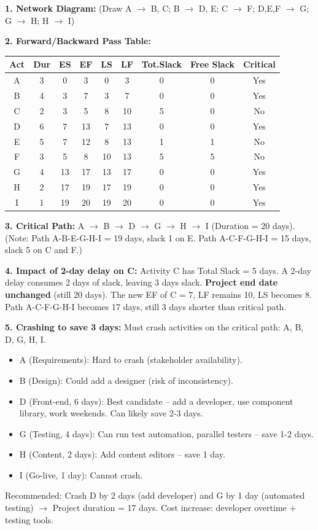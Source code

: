 \documentclass[11pt]{article}
\begin{document}
\begin{corrige}
\textbf{1. Network Diagram:} (Draw A $\to$ B, C; B $\to$ D, E; C $\to$ F; D,E,F $\to$ G; G $\to$ H; H $\to$ I)

\textbf{2. Forward/Backward Pass Table:}

\begin{center}
\begin{tabular}{|c|c|c|c|c|c|c|c|c|}\hline
\rowcolor{popblueL}
Act & Dur & ES & EF & LS & LF & Tot.Slack & Free Slack & Critical \\ \hline
A & 3 & 0 & 3 & 0 & 3 & 0 & 0 & Yes \\
B & 4 & 3 & 7 & 3 & 7 & 0 & 0 & Yes \\
C & 2 & 3 & 5 & 8 & 10 & 5 & 0 & No \\
D & 6 & 7 & 13 & 7 & 13 & 0 & 0 & Yes \\
E & 5 & 7 & 12 & 8 & 13 & 1 & 1 & No \\
F & 3 & 5 & 8 & 10 & 13 & 5 & 5 & No \\
G & 4 & 13 & 17 & 13 & 17 & 0 & 0 & Yes \\
H & 2 & 17 & 19 & 17 & 19 & 0 & 0 & Yes \\
I & 1 & 19 & 20 & 19 & 20 & 0 & 0 & Yes \\ \hline
\end{tabular}
\end{center}

\textbf{3. Critical Path:} A $\to$ B $\to$ D $\to$ G $\to$ H $\to$ I (Duration = 20 days).
(Note: Path A-B-E-G-H-I = 19 days, slack 1 on E. Path A-C-F-G-H-I = 15 days, slack 5 on C and F.)

\textbf{4. Impact of 2-day delay on C:} Activity C has Total Slack = 5 days. A 2-day delay consumes 2 days of slack, leaving 3 days slack. \textbf{Project end date unchanged} (still 20 days). The new EF of C = 7, LF remains 10, LS becomes 8. Path A-C-F-G-H-I becomes 17 days, still 3 days shorter than critical path.

\textbf{5. Crashing to save 3 days:} Must crash activities on the critical path: A, B, D, G, H, I.
\begin{itemize}
    \item A (Requirements): Hard to crash (stakeholder availability).
    \item B (Design): Could add a designer (risk of inconsistency).
    \item D (Front-end, 6 days): Best candidate -- add a developer, use component library, work weekends. Can likely save 2-3 days.
    \item G (Testing, 4 days): Can run test automation, parallel testers -- save 1-2 days.
    \item H (Content, 2 days): Add content editors -- save 1 day.
    \item I (Go-live, 1 day): Cannot crash.
\end{itemize}
Recommended: Crash D by 2 days (add developer) and G by 1 day (automated testing) $\to$ Project duration = 17 days. Cost increase: developer overtime + testing tools.
\end{corrige}
\end{document}
